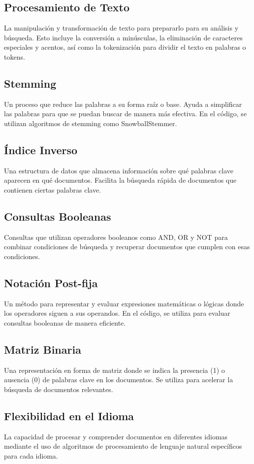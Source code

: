 \subsection{Procesamiento de Texto}
La manipulación y transformación de texto para prepararlo para su análisis y búsqueda. Esto incluye la conversión a minúsculas, la eliminación de caracteres especiales y acentos, así como la tokenización para dividir el texto en palabras o tokens.
\subsection{Stemming}
Un proceso que reduce las palabras a su forma raíz o base. Ayuda a simplificar las palabras para que se puedan buscar de manera más efectiva. En el código, se utilizan algoritmos de stemming como SnowballStemmer.
\subsection{Índice Inverso}
Una estructura de datos que almacena información sobre qué palabras clave aparecen en qué documentos. Facilita la búsqueda rápida de documentos que contienen ciertas palabras clave.
\subsection{Consultas Booleanas}
Consultas que utilizan operadores booleanos como AND, OR y NOT para combinar condiciones de búsqueda y recuperar documentos que cumplen con esas condiciones.
\subsection{Notación Post-fija}
Un método para representar y evaluar expresiones matemáticas o lógicas donde los operadores siguen a sus operandos. En el código, se utiliza para evaluar consultas booleanas de manera eficiente.
\subsection{Matriz Binaria}
Una representación en forma de matriz donde se indica la presencia (1) o ausencia (0) de palabras clave en los documentos. Se utiliza para acelerar la búsqueda de documentos relevantes.
\subsection{Flexibilidad en el Idioma}
La capacidad de procesar y comprender documentos en diferentes idiomas mediante el uso de algoritmos de procesamiento de lenguaje natural específicos para cada idioma.
